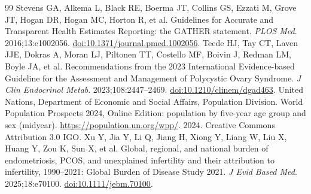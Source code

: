 \documentclass[11pt,a4paper]{article}
\begin{document}
{\begin{thebibliography}{99}
Stevens GA, Alkema L, Black RE, Boerma JT, Collins GS, Ezzati M, Grove JT, Hogan DR, Hogan MC, Horton R, et al. Guidelines for Accurate and Transparent Health Estimates Reporting: the GATHER statement. \emph{PLOS Med}. 2016;13:e1002056. \href{https://doi.org/10.1371/journal.pmed.1002056}{doi:10.1371/journal.pmed.1002056}.
Teede HJ, Tay CT, Laven JJE, Dokras A, Moran LJ, Piltonen TT, Costello MF, Boivin J, Redman LM, Boyle JA, et al. Recommendations from the 2023 International Evidence-based Guideline for the Assessment and Management of Polycystic Ovary Syndrome. \emph{J Clin Endocrinol Metab}. 2023;108:2447--2469. \href{https://doi.org/10.1210/clinem/dgad463}{doi:10.1210/clinem/dgad463}.
United Nations, Department of Economic and Social Affairs, Population Division. World Population Prospects 2024, Online Edition: population by five-year age group and sex (midyear). \url{https://population.un.org/wpp/}. 2024. Creative Commons Attribution 3.0 IGO.
Xu Y, Jia Y, Li Q, Jiang H, Xiong Y, Liang W, Liu X, Huang Y, Zou K, Sun X, et al. Global, regional, and national burden of endometriosis, PCOS, and unexplained infertility and their attribution to infertility, 1990--2021: Global Burden of Disease Study 2021. \emph{J Evid Based Med}. 2025;18:e70100. \href{https://doi.org/10.1111/jebm.70100}{doi:10.1111/jebm.70100}.
\end{thebibliography}
}
\clearpage
\end{document}
